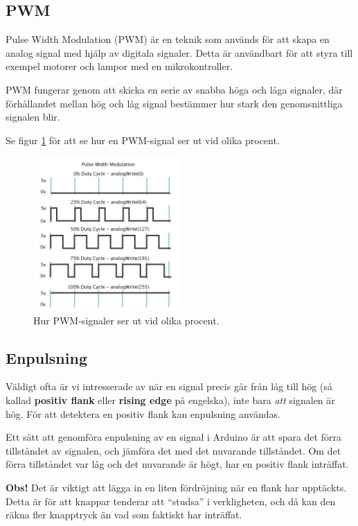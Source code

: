 \documentclass[11pt]{article}
\begin{document}
\subsection{PWM}\label{sec:pwm}
Pulse Width Modulation (PWM) är en teknik som används för att skapa en analog
signal
med hjälp av digitala signaler. Detta är användbart för att styra till exempel
motorer och lampor med en mikrokontroller.

PWM fungerar genom att skicka en serie av snabba höga och låga signaler, där
förhållandet mellan hög och låg signal bestämmer hur stark den genomsnittliga
signalen blir.

Se figur \ref{fig:pwm} för att se hur en PWM-signal ser ut vid olika procent.
\begin{figure}[H]
  \centering
  \includegraphics[width=0.5\textwidth]{pwm}
  \caption{Hur PWM-signaler ser ut vid olika procent.}
  \label{fig:pwm}
\end{figure}

\subsection{Enpulsning}\label{sec:enpulsning}
Väldigt ofta är vi intresserade av när en signal precis går från låg till hög
(så kallad \textbf{positiv flank} eller \textbf{rising edge} på engelska), inte
bara \textit{att} signalen är hög. För att detektera en positiv flank kan
enpulsning användas.

Ett sätt att genomföra enpulsning av en signal i Arduino är att spara det förra
tillståndet av signalen, och jämföra det med det nuvarande tillståndet. Om det
förra tillståndet var låg och det nuvarande är högt, har en positiv flank
inträffat.

\textbf{Obs!} Det är viktigt att lägga in en liten fördröjning när en flank har
upptäckts. Detta är för att knappar tenderar att ``studsa'' i verkligheten, och
då kan den räkna fler knapptryck än vad som faktiskt har inträffat.
\end{document}
